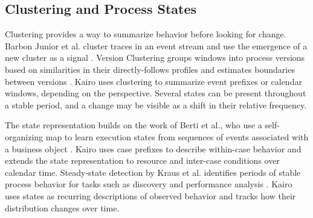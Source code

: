 \subsection{Clustering and Process States}

Clustering provides a way to summarize behavior before looking for change. Barbon Junior et al. cluster traces in an event stream and use the emergence of a new cluster as a signal \cite{barbonjunior2018framework}. Version Clustering groups windows into process versions based on similarities in their directly-follows profiles and estimates boundaries between versions \cite{abarcazuniga2026version}. Kairo uses clustering to summarize event prefixes or calendar windows, depending on the perspective. Several states can be present throughout a stable period, and a change may be visible as a shift in their relative frequency.

The state representation builds on the work of Berti et al., who use a self-organizing map to learn execution states from sequences of events associated with a business object \cite{berti2025ocel}. Kairo uses case prefixes to describe within-case behavior and extends the state representation to resource and inter-case conditions over calendar time. Steady-state detection by Kraus et al. identifies periods of stable process behavior for tasks such as discovery and performance analysis \cite{kraus2026steady}. Kairo uses states as recurring descriptions of observed behavior and tracks how their distribution changes over time.
